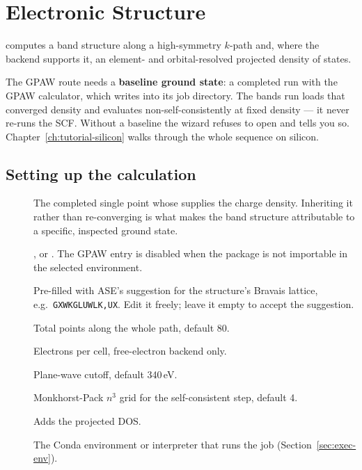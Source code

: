 \chapter{Electronic Structure}
\label{ch:electronic}

\menusep{} computes a band
structure along a high-symmetry $k$-path and, where the backend supports
it, an element- and orbital-resolved projected density of states.

\begin{calwarn}
The GPAW route needs a \textbf{baseline ground state}: a completed
\menusep{} run with the GPAW
calculator, which writes  into its job directory. The
bands run loads that converged density and evaluates non-self-consistently at
fixed density --- it never re-runs the SCF. Without a baseline the wizard
refuses to open and tells you so. Chapter~\ref{ch:tutorial-silicon} walks
through the whole sequence on silicon.
\end{calwarn}

\section{Setting up the calculation}

\begin{description}
  \item[] The completed single point whose
     supplies the charge density. Inheriting it rather
    than re-converging is what makes the band structure attributable to a
    specific, inspected ground state.
  \item[] ,
     or
    . The GPAW entry is
    disabled when the package is not importable in the selected
    environment.
  \item[] Pre-filled with ASE's suggestion for the structure's
    Bravais lattice, e.g.\ \texttt{GXWKGLUWLK,UX}. Edit it freely; leave it
    empty to accept the suggestion.
  \item[] Total points along the whole path, default 80.
  \item[] Electrons per cell, free-electron backend
    only.
  \item[] Plane-wave cutoff, default 340\,eV.
  \item[] Monkhorst-Pack $n^3$ grid for the self-consistent
    step, default 4.
  \item[] Adds the
    projected DOS.
  \item[] The Conda environment or interpreter that runs
    the job (Section~\ref{sec:exec-env}).
\end{description}

